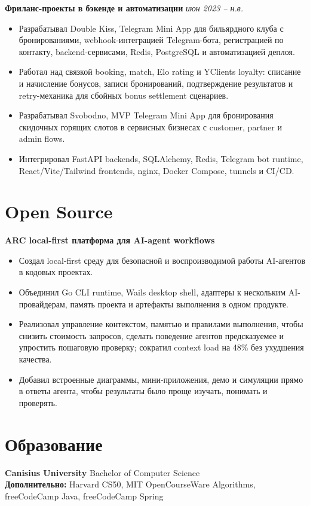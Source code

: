 \documentclass[10pt,a4paper]{article}
\begin{document}
\textbf{Фриланс-проекты в бэкенде и автоматизации} \hfill \textit{июн 2023 -- н.в.}
\begin{itemize}
  \item Разрабатывал Double Kiss, Telegram Mini App для бильярдного клуба с бронированиями, webhook-интеграцией Telegram-бота, регистрацией по контакту, backend-сервисами, Redis, PostgreSQL и автоматизацией деплоя.
  \item Работал над связкой booking, match, Elo rating и YClients loyalty: списание и начисление бонусов, записи бронирований, подтверждение результатов и retry-механика для сбойных bonus settlement сценариев.
  \item Разрабатывал Svobodno, MVP Telegram Mini App для бронирования скидочных горящих слотов в сервисных бизнесах с customer, partner и admin flows.
  \item Интегрировал FastAPI backends, SQLAlchemy, Redis, Telegram bot runtime, React/Vite/Tailwind frontends, nginx, Docker Compose, tunnels и CI/CD.
\end{itemize}

\section*{Open Source}

\textbf{ARC \textbar{} local-first платформа для AI-agent workflows}
\begin{itemize}
  \item Создал local-first среду для безопасной и воспроизводимой работы AI-агентов в кодовых проектах.
  \item Объединил Go CLI runtime, Wails desktop shell, адаптеры к нескольким AI-провайдерам, память проекта и артефакты выполнения в одном продукте.
  \item Реализовал управление контекстом, памятью и правилами выполнения, чтобы снизить стоимость запросов, сделать поведение агентов предсказуемее и упростить пошаговую проверку; сократил context load на 48\% без ухудшения качества.
  \item Добавил встроенные диаграммы, мини-приложения, демо и симуляции прямо в ответы агента, чтобы результаты было проще изучать, понимать и проверять.
\end{itemize}

\section*{Образование}
\textbf{Canisius University} \textbar{} Bachelor of Computer Science\\
\textbf{Дополнительно:} Harvard CS50, MIT OpenCourseWare Algorithms, freeCodeCamp Java, freeCodeCamp Spring
\end{document}
